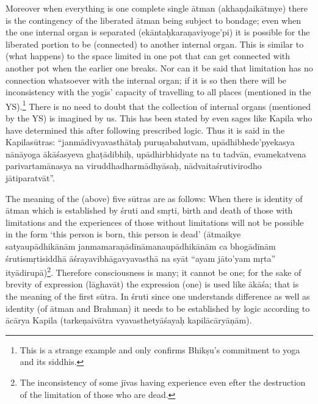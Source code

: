 


\eject

Moreover when everything is one complete single ātman (akhaṇḍaikātmye) there is the contingency of the liberated ātman being subject to bondage; even when the one internal organ is separated (ekāntaḥkara\-ṇaviyoge’pi) it is possible for the liberated portion to be (connected) to another internal organ. This is similar to (what happens) to the space limited in one pot that can get connected with another pot when the earlier one breaks. Nor can it be said that limitation has no connection whatsoever with the internal organ; if it is so then there will be inconsistency with the yogīs’ capacity of travelling to all places (mentioned in the YS).\footnote{This is a strange example and only confirms Bhikṣu’s commitment to yoga and its siddhis.} There is no need to doubt that the collection of internal organs (mentioned by the YS)  is imagined by us. This has been stated by even sages like Kapila who have determined this after following prescribed logic. Thus it is said in the Kapilasūtras: “janmādivyavasthātaḥ puruṣabahutvam, upādhibhede’pyekasya nānāyoga ākāśasyeva ghaṭā\-dibhiḥ, upādhirbhidyate na tu tadvān, evamekatvena parivartamāna\-sya na viruddhadharmādhyāsaḥ, nādvaitaśrutivirodho jātiparatvāt”. 

The meaning of the (above) five sūtras are as follows: When there is identity of ātman   which is established by śruti and smṛti, birth and death of those with limitations and the experiences of those without limitations will not be possible in the form ‘this person is born, this person is dead’ (ātmaikye satyaupādhikānām janmamaraṇādīnāmana\-upādhikānām ca bhogādīnām śrutismṛtisiddhā āśrayavibhāgavyava\-sthā na syāt “ayam jāto’yam mṛta” ityādirupā)\footnote{The inconsistency of some jīvas having experience even efter the destruction of the limitation of those who are dead.}. Therefore consciousness is many; it cannot be one; for the sake of brevity of expression (lāghavāt) the expression (one) is used like ākāśa; that is the meaning of the first sūtra. In śruti since one understands difference as well as identity (of ātman and Brahman) it needs to be established by logic according to ācārya Kapila (tarkeṇaivātra vyavasthetyāśayaḥ kapilācāryāṇām).

